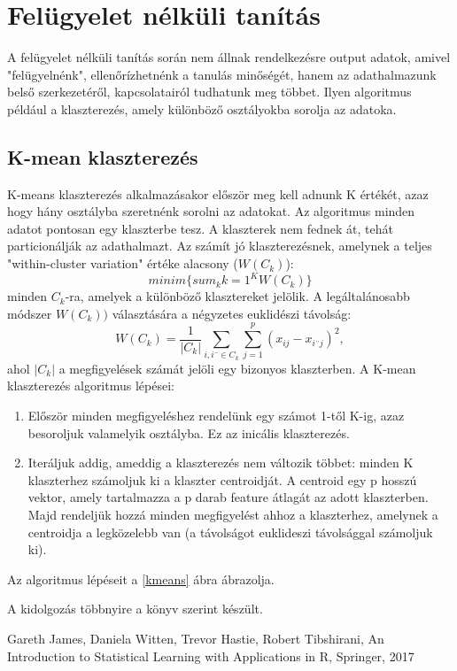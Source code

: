 \documentclass[12pt]{article}
\theoremstyle{plain}
\begin{document}
\section{Felügyelet nélküli tanítás}
A felügyelet nélküli tanítás során nem állnak rendelkezésre output adatok, amivel "felügyelnénk", ellenőrízhetnénk a tanulás minőségét, hanem az adathalmazunk belső szerkezetéről, kapcsolatairól tudhatunk meg többet. Ilyen algoritmus például a klaszterezés, amely különböző osztályokba sorolja az adatoka. 

\subsection{K-mean klaszterezés}
K-means klaszterezés alkalmazásakor először meg kell adnunk K értékét, azaz hogy hány osztályba szeretnénk sorolni az adatokat. Az algoritmus minden adatot pontosan egy klaszterbe tesz. A klaszterek nem fednek át, tehát particionálják az adathalmazt. Az számít jó klaszterezésnek, amelynek a teljes "within-cluster variation" értéke alacsony ($W(C_k)$): $$minim \{sum_k{k=1}^K W(C_k)\}$$ minden $C_k$-ra, amelyek a különböző klasztereket jelölik. A legáltalánosabb módszer $W(C_k))$ választására a négyzetes euklidészi távolság: $$ W(C_k)=\frac{1}{|C_k|} \sum_{i, i¨ \in C_k} \sum_{j=1}^p (x_{ij} - x_{i¨j})^2, $$ ahol $|C_k|$ a megfigyelések számát jelöli egy bizonyos klaszterben. 
A K-mean klaszterezés algoritmus lépései:
\begin{enumerate}
    \item Először minden megfigyeléshez rendelünk egy számot 1-től K-ig, azaz besoroljuk valamelyik osztályba. Ez az inicális klaszterezés. 
    \item Iteráljuk addig, ameddig a klaszterezés nem változik többet: minden K klaszterhez számoljuk ki a klaszter centroidját. A centroid egy p hosszú vektor, amely tartalmazza a p darab feature átlagát az adott klaszterben. Majd rendeljük hozzá minden megfigyelést ahhoz a klaszterhez, amelynek a centroidja a legközelebb van (a távolságot euklideszi távolsággal számoljuk ki). 
\end{enumerate}
Az algoritmus lépéseit a \ref{kmeans} ábra ábrazolja. 



A kidolgozás többnyire a \cite{minden} könyv szerint készült. 

\begin{thebibliography}

Gareth James, Daniela Witten, Trevor Hastie, Robert Tibshirani, An Introduction to Statistical Learning with Applications in R, Springer, 2017



\end{thebibliography}
\end{document}
